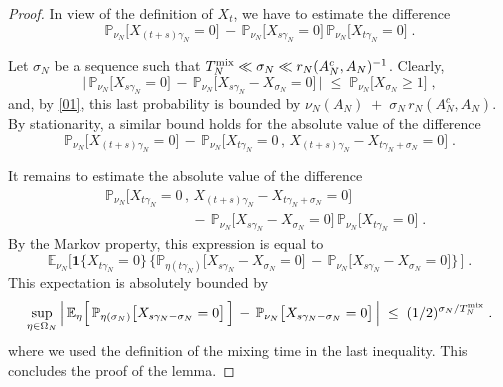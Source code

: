 \documentclass[reqno]{amsart}
\begin{document}
\begin{proof}
In view of the definition of $X_t$, we have to estimate the difference 
\begin{equation*}
{{\mathbb P}}_{\nu_N} \big[ X_{(t+s) \gamma_N}=0 \big] \,-\, 
{{\mathbb P}}_{\nu_N} \big[ X_{s \gamma_N}=0 \big] \, 
{{\mathbb P}}_{\nu_N} \big[ X_{t \gamma_N}=0 \big] \;.
\end{equation*}

Let $\sigma_N$ be a sequence such that $T^{\rm mix}_N \ll \sigma_N
\ll r_N(A_N^c, A_N)^{-1}$. Clearly,
\begin{equation*}
\Big|\, {{\mathbb P}}_{\nu_N} \big[ X_{s \gamma_N}=0 \big] \,-\, 
{{\mathbb P}}_{\nu_N} \big[ X_{s \gamma_N} - X_{\sigma_N} =0 
\big]  \, \Big| \;\le \; 
{{\mathbb P}}_{\nu_N} \big[ X_{\sigma_N} \ge 1 \big] 
\;,
\end{equation*}
and, by \eqref{01}, this last probability is bounded by $\nu_N (A_N)
\;+\; \sigma_N \, r_N(A_N^c, A_N)$.  By stationarity, a similar bound
holds for the absolute value of the difference
\begin{equation*}
{{\mathbb P}}_{\nu_N} \big[ X_{(t+s) \gamma_N}=0 \big] \,-\,
{{\mathbb P}}_{\nu_N} \big[ X_{t \gamma_N}=0 \,,\,
X_{(t+s) \gamma_N} - X_{t \gamma_N + \sigma_N} =0  \big] \;.
\end{equation*}

It remains to estimate the absolute value of the difference
\begin{equation*}
\begin{split}
& 
{{\mathbb P}}_{\nu_N} \big[ X_{t \gamma_N}=0 \,,\,
X_{(t+s) \gamma_N} - X_{t \gamma_N + \sigma_N} =0  \big] \\
&\qquad \qquad \qquad \,-\, 
{{\mathbb P}}_{\nu_N} \big[ X_{s \gamma_N} - X_{\sigma_N} =0 \big] \, 
{{\mathbb P}}_{\nu_N} \big[ X_{t \gamma_N}=0 \big] \;.
\end{split}
\end{equation*}
By the Markov property, this expression is equal to
\begin{equation*}
{{\mathbb E}}_{\nu_N} \Big[ {{\mathbf 1}}\{ X_{t \gamma_N}=0\} \,
\Big\{ {{\mathbb P}}_{\eta(t \gamma_N)} \big[  X_{s \gamma_N} - X_{\sigma_N}
=0  \big] \,-\, 
{{\mathbb P}}_{\nu_N} \big[ X_{s \gamma_N} - X_{\sigma_N} =0
\big] \Big\}\, \Big]\;.
\end{equation*}
This expectation is absolutely bounded by
\begin{equation*}
\sup_{\eta\in \Omega_N}
\Big |\, {{\mathbb E}}_{\eta} \Big[  \,{{\mathbb P}}_{\eta(\sigma_N)} \big[ X_{s
  \gamma_N - \sigma_N} =0  \big]\, \Big] \,-\, 
{{\mathbb P}}_{\nu_N} \big[ X_{s\gamma_N - \sigma_N} =0
\big] \, \Big| \;\le\; (1/2)^{\sigma_N/T^{\rm mix}_N}\;.
\end{equation*}
where we used the definition of the mixing time in the last
inequality. This concludes the proof of the lemma.
\end{proof}
\end{document}
